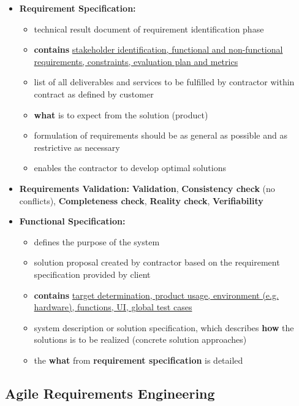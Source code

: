 \documentclass[ieeetran]{article}
\begin{document}
\begin{itemize}
\item \textbf{Requirement Specification:}
	\begin{itemize}
	  \item technical result document of requirement identification phase
	\item \textbf{contains} \underline{stakeholder identification, functional and non-functional}\\ \underline{requirements, constraints, evaluation plan and metrics}
	\item list of all deliverables and services to be fulfilled by contractor within contract as defined by customer
	\item \textbf{what} is to expect from the solution (product)
	\item formulation of requirements should be as general as possible and as restrictive as necessary
	\item enables the contractor to develop optimal solutions
	\end{itemize}

\item \textbf{Requirements Validation:} \textbf{Validation}, \textbf{Consistency check} (no conflicts), \textbf{Completeness check}, \textbf{Reality check}, \textbf{Verifiability}

\item \textbf{Functional Specification:}
	\begin{itemize}
	\item defines the purpose of the system
	  \item solution proposal created by contractor based on the requirement specification provided by client
		  \item \textbf{contains} \underline{target determination, product usage, environment (e.g.}\\ \underline{hardware), functions, UI, global test cases} 
	\item system description or solution specification, which describes \textbf{how} the solutions is to be realized (concrete solution approaches)
	\item the \textbf{what} from \textbf{requirement specification} is detailed
	\end{itemize}
\end{itemize}

\subsection{Agile Requirements Engineering} %
\label{sub:agile_requirements_engineering}
\end{document}
